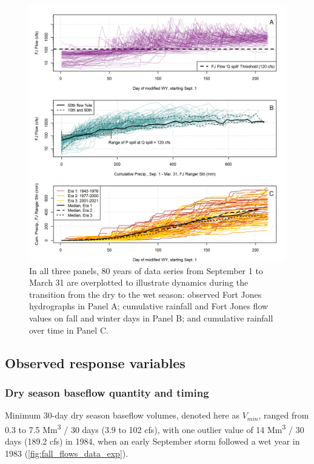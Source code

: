 \documentclass[hess, manuscript]{copernicus}
\begin{document}
\begin{figure}
\includegraphics[width=1\linewidth]{f05} \caption{\label{fig:time_v_fall_rains_v_flow_fig} In all three panels, 80 years of data series from September 1 to March 31 are overplotted to illustrate dynamics during the transition from the dry to the wet season: observed Fort Jones hydrographs in Panel A; cumulative rainfall and Fort Jones flow values on fall and winter days in Panel B; and cumulative rainfall over time in Panel C.}\label{fig:time_v_fall_rains_v_flow_fig}
\end{figure}

\subsection{Observed response variables}

\subsubsection{Dry season baseflow quantity and timing}

Minimum 30-day dry season baseflow volumes, denoted here as \(V_{min}\),
ranged from 0.3 to 7.5 Mm\textsuperscript{3} / 30 days (3.9 to 102 cfs),
with one outlier value of 14 Mm\textsuperscript{3} / 30 days (189.2 cfs)
in 1984, when an early September storm followed a wet year in 1983
(\autoref{fig:fall_flows_data_exp}).
\end{document}
